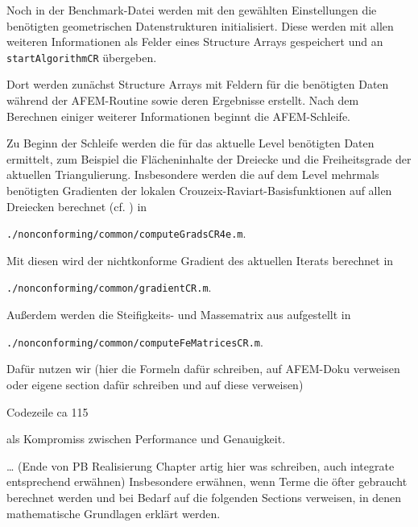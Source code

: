 Noch in der Benchmark-Datei werden mit den gewählten Einstellungen die
benötigten geometrischen Datenstrukturen initialisiert. 
Diese werden mit allen weiteren Informationen als Felder eines Structure Arrays
gespeichert und an \texttt{startAlgorithmCR} übergeben. 

Dort werden zunächst Structure Arrays mit Feldern für die benötigten Daten
während der AFEM-Routine sowie deren Ergebnisse erstellt. 
Nach dem Berechnen einiger weiterer Informationen beginnt die AFEM-Schleife.

Zu Beginn der Schleife werden die für das aktuelle Level benötigten Daten
ermittelt, zum Beispiel die Flächeninhalte der Dreiecke und die Freiheitsgrade
der aktuellen Triangulierung. 
Insbesondere werden die auf dem Level mehrmals benötigten Gradienten der
lokalen Crouzeix-Raviart-Basisfunktionen auf allen Dreiecken berechnet (cf.
\cite[Abschnitt 1.4.2]{CGKNRR10}) in
\begin{center}
  \texttt{./nonconforming/common/computeGradsCR4e.m}.
\end{center}

Mit diesen wird der nichtkonforme Gradient des aktuellen Iterats 
berechnet in
\begin{center}
  \texttt{./nonconforming/common/gradientCR.m}.
\end{center}

Außerdem werden die Steifigkeits- und Massematrix aus
 aufgestellt in
\begin{center}
  \texttt{./nonconforming/common/computeFeMatricesCR.m}.
\end{center}
Dafür nutzen wir (hier die Formeln dafür schreiben, auf AFEM-Doku verweisen
oder eigene section dafür schreiben und auf diese verweisen)

Codezeile ca 115


als Kompromiss zwischen Performance und Genauigkeit.


\ldots
(Ende von PB Realisierung Chapter artig hier was schreiben, auch integrate
entsprechend erwähnen)
Insbesondere erwähnen, wenn Terme die öfter gebraucht berechnet werden und
bei Bedarf auf die folgenden Sections verweisen, in denen mathematische
Grundlagen erklärt werden.

